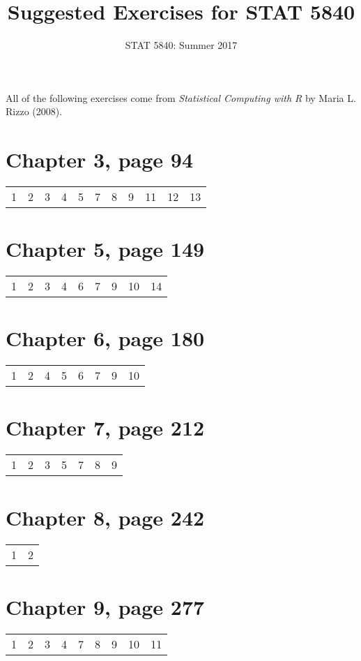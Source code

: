 \documentclass[10pt,english]{article}
\date{STAT 5840: Summer 2017}
\title{Suggested Exercises for STAT 5840}
\begin{document}
\maketitle
\thispagestyle{empty}

All of the following exercises come from \emph{Statistical Computing with R} by Maria L. Rizzo (2008).

\section*{Chapter 3, page 94}
\label{sec:orgheadline1}
\begin{center}
\begin{tabular}{rrrrrrrrrrr}
1 & 2 & 3 & 4 & 5 & 7 & 8 & 9 & 11 & 12 & 13\\
\end{tabular}
\end{center}

\section*{Chapter 5, page 149}
\label{sec:orgheadline2}
\begin{center}
\begin{tabular}{rrrrrrrrr}
1 & 2 & 3 & 4 & 6 & 7 & 9 & 10 & 14\\
\end{tabular}
\end{center}

\section*{Chapter 6, page 180}
\label{sec:orgheadline3}
\begin{center}
\begin{tabular}{rrrrrrrr}
1 & 2 & 4 & 5 & 6 & 7 & 9 & 10\\
\end{tabular}
\end{center}

\section*{Chapter 7, page 212}
\label{sec:orgheadline4}
\begin{center}
\begin{tabular}{rrrrrrr}
1 & 2 & 3 & 5 & 7 & 8 & 9\\
\end{tabular}
\end{center}

\section*{Chapter 8, page 242}
\label{sec:orgheadline5}
\begin{center}
\begin{tabular}{rr}
1 & 2\\
\end{tabular}
\end{center}

\section*{Chapter 9, page 277}
\label{sec:orgheadline6}
\begin{center}
\begin{tabular}{rrrrrrrrr}
1 & 2 & 3 & 4 & 7 & 8 & 9 & 10 & 11\\
\end{tabular}
\end{center}
\end{document}
